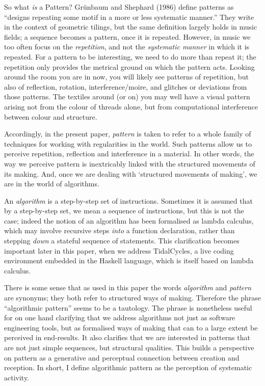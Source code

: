 \documentclass{nime-alternate} %
\begin{document}
So what \emph{is} a Pattern? Grünbaum and Shephard (1986) define
patterns as ``designs repeating some motif in a more or less systematic
manner.'' They write in the context of geometric tilings, but the same
definition largely holds in music fields; a sequence becomes a pattern,
once it is repeated. However, in music we too often focus on the
\emph{repetition}, and not the \emph{systematic manner} in which it is
repeated. For a pattern to be interesting, we need to do more than
repeat it; the repetition only provides the metrical ground on which the
pattern acts. Looking around the room you are in now, you will likely
see patterns of repetition, but also of reflection, rotation,
interference/moire, and glitches or deviations from those patterns. The
textiles around (or on) you may well have a visual pattern arising not
from the colour of threads alone, but from computational interference
between colour and structure.

Accordingly, in the present paper, \emph{pattern} is taken to refer to a
whole family of techniques for working with regularities in the world.
Such patterns allow us to perceive repetition, reflection and
interference in a material. In other words, the way we perceive pattern
is inextricably linked with the structured movements of its making. And,
once we are dealing with `structured movements of making', we are in the
world of algorithms.

An \emph{algorithm} is a step-by-step set of instructions. Sometimes it
is assumed that by a step-by-step set, we mean a sequence of
instructions, but this is not the case; indeed the notion of an
algorithm has been formalised as lambda calculus, which may involve
recursive steps \emph{into} a function declaration, rather than stepping
\emph{down} a stateful sequence of statements. This clarification
becomes important later in this paper, when we address TidalCycles, a
live coding environment embedded in the Haskell language, which is
itself based on lambda calculus.

There is some sense that as used in this paper the words
\emph{algorithm} and \emph{pattern} are synonyms; they both refer to
structured ways of making. Therefore the phrase ``algorithmic pattern''
seems to be a tautology. The phrase is nonetheless useful for on one
hand clarifying that we address algorithms not just as software
engineering tools, but as formalised ways of making that can to a large
extent be perceived in end-results. It also clarifies that we are
interested in patterns that are not just simple sequences, but
structural qualities. This builds a perspective on pattern as a
generative and perceptual connection between creation and reception. In
short, I define algorithmic pattern as the perception of systematic
activity.
\end{document}
